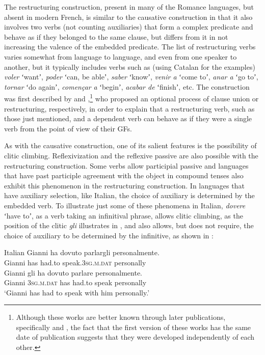 \documentclass[output=paper,hidelinks]{langscibook}
\begin{document}
The restructuring construction, present in many of the Romance languages, but absent in modern French, is similar to the causative construction in that it also involves two verbs (not counting auxiliaries) that form a complex predicate and behave as if they belonged to the same clause, but differs from it in not increasing the valence of the embedded predicate. The list of restructuring verbs varies somewhat from language to language, and even from one speaker to another, but it typically includes verbs such as (using Catalan for the examples) \textit{voler} ʻwantʼ, \textit{poder} ʻcan, be ableʼ, \textit{saber} ʻknowʼ, \textit{venir a} ʻcome toʼ, \textit{anar a} ʻgo toʼ, \textit{tornar} ʻdo againʼ, \textit{començar} \textit{a} ʻbeginʼ, \textit{acabar de} ʻfinishʼ, etc. The construction was first described by \citet{AiPe76} and \citet{Rizzi1976},\footnote{Although these works are better known through later publications, specifically \citet{AiPe83} and \citet{Rizzi:Issues}, the fact that the first version of these works has the same date of publication suggests that they were developed independently of each other.} who proposed an optional process of clause union or restructuring, respectively, in order to explain that a restructuring verb, such as those just mentioned, and a dependent verb can behave as if they were a single verb from the point of view of their GFs.

As with the causative construction, one of its salient features is the possibility of clitic climbing. Reflexivization and the reflexive passive are also possible with the restructuring construction. Some verbs allow participial passive and languages that have past participle agreement with the object in compound tenses also exhibit this phenomenon in the restructuring construction. In languages that have auxiliary selection, like Italian, the choice of auxiliary is determined by the embedded verb. To illustrate just some of these phenomena in Italian, \textit{dovere} ʻhave toʼ, as a verb taking an infinitival phrase, allows clitic climbing, as the position of the clitic \textit{gli} illustrates in , and also allows, but does not require, the choice of auxiliary to be determined by the infinitive, as shown in :
\largerpage

\ea\label{ex:Romance:55}   Italian  \citep[4]{Rizzi:Issues}
\ea\label{ex:Romance:55a}
\gll Gianni ha dovuto parlargli personalmente.\\
      Gianni has had.to speak.3\textsc{sg.m.}\textsc{dat} personally\\
      \ex\label{ex:Romance:55b}
      \gll
       Gianni gli ha dovuto parlare personalmente.\\
       Gianni 3\textsc{sg.m.}\textsc{dat} has had.to speak personally\\
\glt   `Gianni has had to speak with him personally.'\z\z
\end{document}
